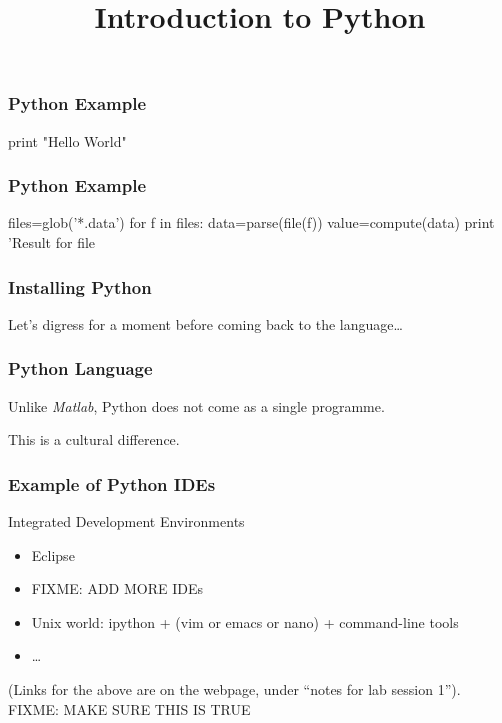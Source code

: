 
\title{Introduction to Python}



\begin{frame}[fragile]
\frametitle{Python Example}

\begin{python}
print "Hello World"
\end{python}
\end{frame}

\begin{frame}[fragile]
\frametitle{Python Example}

\begin{python}
files=glob('*.data')
for f in files:
    data=parse(file(f))
    value=compute(data)
    print 'Result for file %
\end{python}
\end{frame}

\begin{frame}[fragile]
\frametitle{Installing Python}

Let's digress for a moment before coming back to the language\ldots
\end{frame}


\begin{frame}[fragile]
\frametitle{Python Language}

Unlike \textit{Matlab}, Python does not come as a single programme.

This is a cultural difference.

\end{frame}

\begin{frame}[fragile]
\frametitle{Example of Python IDEs}

\begin{block}{Integrated Development Environments}
\begin{itemize}
\item Eclipse
\item FIXME: ADD MORE IDEs
\item Unix world: ipython + (vim or emacs or nano) + command-line tools
\item \ldots
\end{itemize}
\end{block}

(Links for the above are on the webpage, under ``notes for lab session 1''). FIXME: MAKE SURE THIS IS TRUE
\end{frame}

